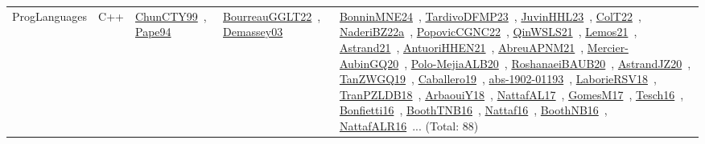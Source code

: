 {\begin{longtable}{lp{3cm}>{\raggedright\arraybackslash}p{6cm}>{\raggedright\arraybackslash}p{6cm}>{\raggedright\arraybackslash}p{8cm}}
ProgLanguages & C++ & \href{../works/ChunCTY99.pdf}{ChunCTY99}~\cite{ChunCTY99}, \href{../works/Pape94.pdf}{Pape94}~\cite{Pape94} & \href{../works/BourreauGGLT22.pdf}{BourreauGGLT22}~\cite{BourreauGGLT22}, \href{../works/Demassey03.pdf}{Demassey03}~\cite{Demassey03} & \href{../works/BonninMNE24.pdf}{BonninMNE24}~\cite{BonninMNE24}, \href{../works/TardivoDFMP23.pdf}{TardivoDFMP23}~\cite{TardivoDFMP23}, \href{../works/JuvinHHL23.pdf}{JuvinHHL23}~\cite{JuvinHHL23}, \href{../works/ColT22.pdf}{ColT22}~\cite{ColT22}, \href{../works/NaderiBZ22a.pdf}{NaderiBZ22a}~\cite{NaderiBZ22a}, \href{../works/PopovicCGNC22.pdf}{PopovicCGNC22}~\cite{PopovicCGNC22}, \href{../works/QinWSLS21.pdf}{QinWSLS21}~\cite{QinWSLS21}, \href{../works/Lemos21.pdf}{Lemos21}~\cite{Lemos21}, \href{../works/Astrand21.pdf}{Astrand21}~\cite{Astrand21}, \href{../works/AntuoriHHEN21.pdf}{AntuoriHHEN21}~\cite{AntuoriHHEN21}, \href{../works/AbreuAPNM21.pdf}{AbreuAPNM21}~\cite{AbreuAPNM21}, \href{../works/Mercier-AubinGQ20.pdf}{Mercier-AubinGQ20}~\cite{Mercier-AubinGQ20}, \href{../works/Polo-MejiaALB20.pdf}{Polo-MejiaALB20}~\cite{Polo-MejiaALB20}, \href{../works/RoshanaeiBAUB20.pdf}{RoshanaeiBAUB20}~\cite{RoshanaeiBAUB20}, \href{../works/AstrandJZ20.pdf}{AstrandJZ20}~\cite{AstrandJZ20}, \href{../works/TanZWGQ19.pdf}{TanZWGQ19}~\cite{TanZWGQ19}, \href{../works/Caballero19.pdf}{Caballero19}~\cite{Caballero19}, \href{../works/abs-1902-01193.pdf}{abs-1902-01193}~\cite{abs-1902-01193}, \href{../works/LaborieRSV18.pdf}{LaborieRSV18}~\cite{LaborieRSV18}, \href{../works/TranPZLDB18.pdf}{TranPZLDB18}~\cite{TranPZLDB18}, \href{../works/ArbaouiY18.pdf}{ArbaouiY18}~\cite{ArbaouiY18}, \href{../works/NattafAL17.pdf}{NattafAL17}~\cite{NattafAL17}, \href{../works/GomesM17.pdf}{GomesM17}~\cite{GomesM17}, \href{../works/Tesch16.pdf}{Tesch16}~\cite{Tesch16}, \href{../works/Bonfietti16.pdf}{Bonfietti16}~\cite{Bonfietti16}, \href{../works/BoothTNB16.pdf}{BoothTNB16}~\cite{BoothTNB16}, \href{../works/Nattaf16.pdf}{Nattaf16}~\cite{Nattaf16}, \href{../works/BoothNB16.pdf}{BoothNB16}~\cite{BoothNB16}, \href{../works/NattafALR16.pdf}{NattafALR16}~\cite{NattafALR16}... (Total: 88)\\

\end{longtable}}

